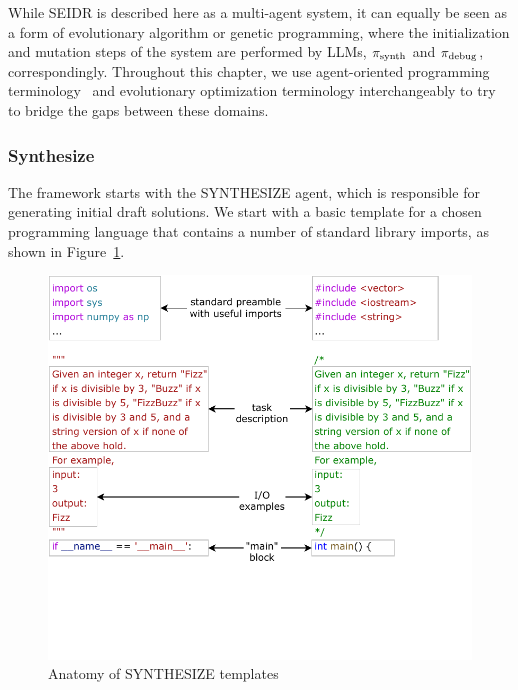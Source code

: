 While SEIDR is described here as a multi-agent system, it can equally be seen as a form of evolutionary algorithm or genetic programming, where the initialization and mutation steps of the system are performed by LLMs, $ \pi_\text{synth} $ and $ \pi_\text{debug} $, correspondingly.
Throughout this chapter, we use agent-oriented programming terminology~\cite{shoham1993:agentoriented} and evolutionary optimization terminology interchangeably to try to bridge the gaps between these domains.

\subsubsection{Synthesize}
\label{sec:seidr-synth}

The framework starts with the SYNTHESIZE agent, which is responsible for generating initial draft solutions.
We start with a basic template for a chosen programming language that contains a number of standard library imports, as shown in Figure~\ref{fig:template}.

\begin{figure}
    \centering
    \includegraphics[width=0.8\linewidth, trim={0mm 40mm 0mm 0mm}, clip]{images/Templates-new-v2.pdf}
    \caption{Anatomy of SYNTHESIZE templates}
    \label{fig:template}
\end{figure}

